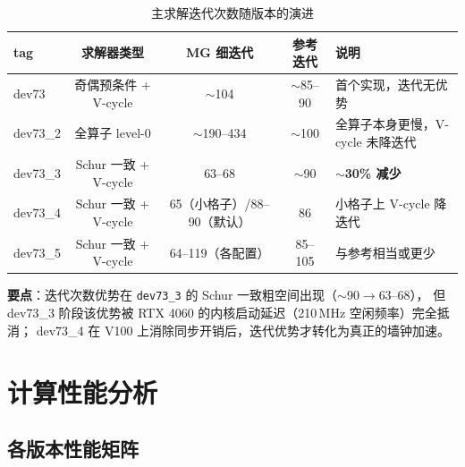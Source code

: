 \documentclass[11pt,a4paper]{article}
\begin{document}
\begin{table}[H]
\centering
\begin{tabular}{lcccl}
\toprule
tag & 求解器类型 & MG 细迭代 & 参考迭代 & 说明 \\
\midrule
dev73   & 奇偶预条件 + V-cycle & $\sim$104 & $\sim$85--90 & 首个实现，迭代无优势 \\
dev73\_2 & 全算子 level-0 & $\sim$190--434 & $\sim$100 & 全算子本身更慢，V-cycle 未降迭代 \\
dev73\_3 & Schur 一致 + V-cycle & 63--68 & $\sim$90 & \textbf{$\sim$30\% 减少} \\
dev73\_4 & Schur 一致 + V-cycle & 65（小格子）/88--90（默认） & 86 & 小格子上 V-cycle 降迭代 \\
dev73\_5 & Schur 一致 + V-cycle & 64--119（各配置） & 85--105 & 与参考相当或更少 \\
\bottomrule
\end{tabular}
\caption{主求解迭代次数随版本的演进}
\end{table}

\textbf{要点}：迭代次数优势在 \texttt{dev73\_3} 的 Schur 一致粗空间出现（$\sim$90$\to$63--68），
但 dev73\_3 阶段该优势被 RTX 4060 的内核启动延迟（210\,MHz 空闲频率）完全抵消；
dev73\_4 在 V100 上消除同步开销后，迭代优势才转化为真正的墙钟加速。

\section{计算性能分析}
\label{sec:perf-analysis}

\subsection{各版本性能矩阵}
\label{sec:perf-matrix}
\end{document}
